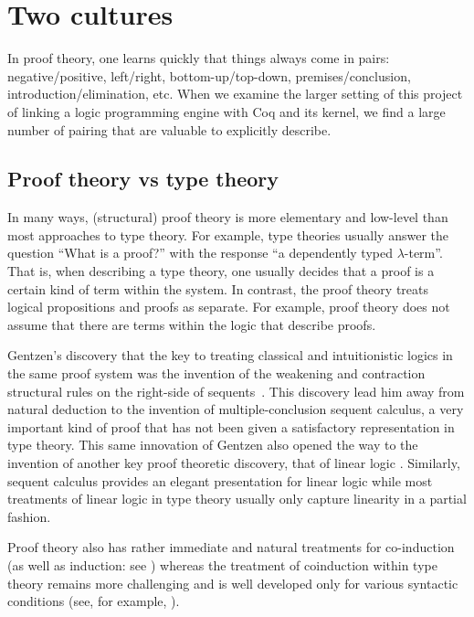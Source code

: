 \documentclass[a4paper,USenglish,cleveref, autoref, thm-restate]{lipics-v2019}
\begin{document}
\section{Two cultures}

In proof theory, one learns quickly that things always come in pairs:
negative/positive, left/right, bottom-up/top-down,
premises/conclusion, introduction/elimination,
etc.
%
When we examine the larger setting of this project of linking a logic
programming engine with Coq and its kernel, we find a large number of
pairing that are valuable to explicitly describe.

\subsection{Proof theory vs type theory}

In many ways, (structural) proof theory is more elementary and
low-level than most approaches to type theory.  For example, type
theories usually answer the question ``What is a proof?'' with the
response ``a dependently typed $\lambda$-term''.  That is, when
describing a type theory, one usually decides that a proof is a
certain kind of term within the system.  In contrast, the proof theory
treats logical propositions and proofs as separate.  For example,
proof theory does not assume that there are terms within the logic
that describe proofs.

Gentzen's discovery that the key to treating classical and
intuitionistic logics in the same proof system was the invention of
the weakening and contraction structural rules on the right-side of
sequents~\cite{gentzen35}.  This discovery lead him away from natural
deduction to the invention of multiple-conclusion sequent calculus, a
very important kind of proof that has not been given a satisfactory
representation in type theory.  This same innovation of Gentzen also
opened the way to the invention of another key proof theoretic
discovery, that of linear logic \cite{girard87tcs}.
Similarly, sequent calculus provides an elegant presentation for
linear logic while most treatments of linear logic in type theory
usually only capture linearity in a partial fashion.

Proof theory also has rather immediate and natural treatments for
co-induction (as well as induction: see
\cite{baelde12tocl,momigliano12jal}) whereas the treatment of
coinduction within type theory remains more challenging and is well
developed only for various syntactic conditions (see, for example,
\cite{bertot08entcs}).
\end{document}
